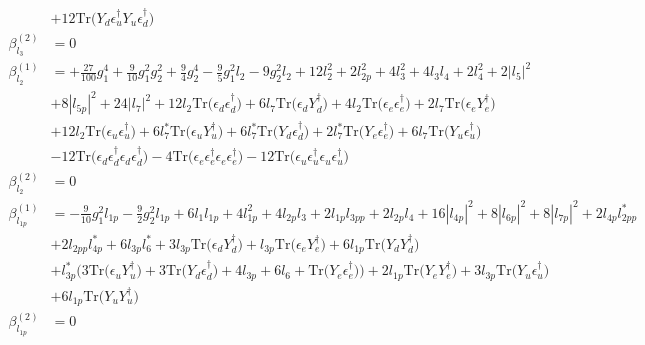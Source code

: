 {\begin{align}
 &+12 \mbox{Tr}\Big({Y_d  \epsilon_{u}^{\dagger}  Y_u  \epsilon_{d}^{\dagger}}\Big) \\ 
\beta_{l_3}^{(2)} & =  
0\\ 
\beta_{l_2}^{(1)} & =  
+\frac{27}{100} g_{1}^{4} +\frac{9}{10} g_{1}^{2} g_{2}^{2} +\frac{9}{4} g_{2}^{4} -\frac{9}{5} g_{1}^{2} l_2 -9 g_{2}^{2} l_2 +12 l_{2}^{2} +2 l_{2p}^{2} +4 l_{3}^{2} +4 l_3 l_4 +2 l_{4}^{2} +2 |l_5|^2 \nonumber \\ 
 &+8 |l_{5p}|^2 +24 |l_7|^2 +12 l_2 \mbox{Tr}\Big({\epsilon_d  \epsilon_{d}^{\dagger}}\Big) +6 l_7 \mbox{Tr}\Big({\epsilon_d  Y_{d}^{\dagger}}\Big) +4 l_2 \mbox{Tr}\Big({\epsilon_e  \epsilon_{e}^{\dagger}}\Big) +2 l_7 \mbox{Tr}\Big({\epsilon_e  Y_{e}^{\dagger}}\Big) \nonumber \\ 
 &+12 l_2 \mbox{Tr}\Big({\epsilon_u  \epsilon_{u}^{\dagger}}\Big) +6 l_7^* \mbox{Tr}\Big({\epsilon_u  Y_{u}^{\dagger}}\Big) +6 l_7^* \mbox{Tr}\Big({Y_d  \epsilon_{d}^{\dagger}}\Big) +2 l_7^* \mbox{Tr}\Big({Y_e  \epsilon_{e}^{\dagger}}\Big) +6 l_7 \mbox{Tr}\Big({Y_u  \epsilon_{u}^{\dagger}}\Big) \nonumber \\ 
 &-12 \mbox{Tr}\Big({\epsilon_d  \epsilon_{d}^{\dagger}  \epsilon_d  \epsilon_{d}^{\dagger}}\Big) -4 \mbox{Tr}\Big({\epsilon_e  \epsilon_{e}^{\dagger}  \epsilon_e  \epsilon_{e}^{\dagger}}\Big) -12 \mbox{Tr}\Big({\epsilon_u  \epsilon_{u}^{\dagger}  \epsilon_u  \epsilon_{u}^{\dagger}}\Big) \\ 
\beta_{l_2}^{(2)} & =  
0\\ 
\beta_{l_{1p}}^{(1)} & =  
-\frac{9}{10} g_{1}^{2} l_{1p} -\frac{9}{2} g_{2}^{2} l_{1p} +6 l_1 l_{1p} +4 l_{1p}^{2} +4 l_{2p} l_3 +2 l_{1p} l_{3pp} +2 l_{2p} l_4 +16 |l_{4p}|^2 +8 |l_{6p}|^2 +8 |l_{7p}|^2 +2 l_{4p} l_{2pp}^* \nonumber \\ 
 &+2 l_{2pp} l_{4p}^* +6 l_{3p} l_6^* +3 l_{3p} \mbox{Tr}\Big({\epsilon_d  Y_{d}^{\dagger}}\Big) +l_{3p} \mbox{Tr}\Big({\epsilon_e  Y_{e}^{\dagger}}\Big) +6 l_{1p} \mbox{Tr}\Big({Y_d  Y_{d}^{\dagger}}\Big) \nonumber \\ 
 &+l_{3p}^* \Big(3 \mbox{Tr}\Big({\epsilon_u  Y_{u}^{\dagger}}\Big)  + 3 \mbox{Tr}\Big({Y_d  \epsilon_{d}^{\dagger}}\Big)  + 4 l_{3p}  + 6 l_6  + \mbox{Tr}\Big({Y_e  \epsilon_{e}^{\dagger}}\Big)\Big)+2 l_{1p} \mbox{Tr}\Big({Y_e  Y_{e}^{\dagger}}\Big) +3 l_{3p} \mbox{Tr}\Big({Y_u  \epsilon_{u}^{\dagger}}\Big) \nonumber \\ 
 &+6 l_{1p} \mbox{Tr}\Big({Y_u  Y_{u}^{\dagger}}\Big) \\ 
\beta_{l_{1p}}^{(2)} & =  
0\\ 

\end{align}}
